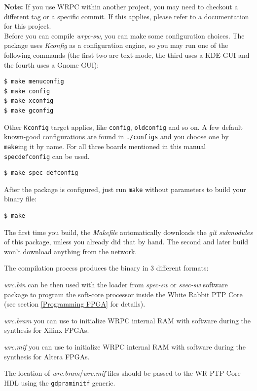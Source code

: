 \documentclass[a4paper, 12pt]{article}
\renewcommand{\_}{\underscore\allowbreak}
\newcommand{\code}[1]{\texttt{#1}}
\begin{document}
\textbf{Note:} If you use WRPC within another project, you may need to checkout
a different tag or a specific commit. If this applies, please refer to a
documentation for this project.\\

Before you can compile \textit{wrpc-sw}, you can make some configuration
choices. The package uses \textit{Kconfig} as a configuration engine, so you may
run one of the following commands (the first two are text-mode, the third uses
a KDE GUI and the fourth uses a Gnome GUI):
\begin{lstlisting}
$ make menuconfig
$ make config
$ make xconfig
$ make gconfig
\end{lstlisting}

Other \code{Kconfig} target applies, like \code{config}, \code{oldconfig}
and so on. A few default known-good configurations are found in
\texttt{./configs} and you choose one by \code{make}ing it by name. For all
three boards mentioned in this manual \code{spec\_defconfig} can be used.
\begin{lstlisting}
$ make spec_defconfig
\end{lstlisting}

After the package is configured, just run \code{make} without parameters to
build your binary file:
\begin{lstlisting}
$ make
\end{lstlisting}

The first time you build, the \textit{Makefile} automatically downloads
the \textit{git submodules} of this package, unless you already did that
by hand. The second and later build won't download anything
from the network.

The compilation process produces the binary in 3 different formats:
\begin{itemize*}
  \item \textit{wrc.bin} can be then used with the loader from \textit{spec-sw}
    or \textit{svec-sw} software package to program the soft-core processor
    inside the White
    Rabbit PTP Core (see section \ref{Programming FPGA} for details).
  \item \textit{wrc.bram} you can use to initialize WRPC internal RAM with
    software during the synthesis for Xilinx FPGAs.
  \item \textit{wrc.mif} you can use to initialize WRPC internal RAM with
    software during the synthesis for Altera FPGAs.
\end{itemize*}
The location of \textit{wrc.bram}/\textit{wrc.mif} files should be passed to the
WR PTP Core HDL using the \texttt{g\_dpram\_initf} generic.
\end{document}
